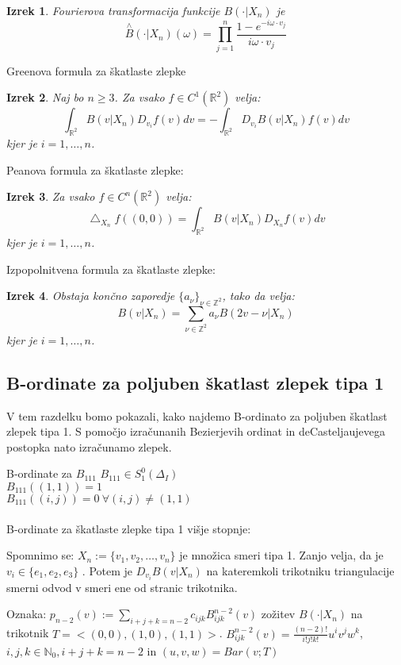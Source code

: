 \documentclass[12pt]{article}
\newtheorem{theorem}{Izrek}
\begin{document}
\begin{theorem}
Fourierova transformacija funkcije $B(\cdot|X_n)$ je 
$$\overset{\wedge}{B}(\cdot|X_n)(\omega) = \prod_{j=1}^n \frac{1-e^{-i\omega \cdot v_j}}{i \omega \cdot v_j}$$
\end{theorem}

Greenova formula za škatlaste zlepke
\begin{theorem}
Naj bo $n\geq 3$. Za vsako $f \in C^1(\mathbb{R}^2)$ velja: 
$$\int_{\mathbb{R}^2} B(v|X_n) D_{v_i} f(v) dv = - \int_{\mathbb{R}^2} D_{v_i} B(v|X_n) f(v) dv$$
kjer je $i = 1, \ldots, n$.
\end{theorem}

Peanova formula za škatlaste zlepke:
\begin{theorem}
Za vsako $f \in C^n(\mathbb{R}^2)$ velja: 
$$\bigtriangleup_{X_n} f((0,0))=  \int_{\mathbb{R}^2} B(v|X_n)D_{X_n} f(v) dv$$
kjer je $i = 1, \ldots, n$.
\end{theorem}

Izpopolnitvena formula za škatlaste zlepke: %
\begin{theorem}
Obstaja končno zaporedje $\{a_{\nu}\}_{\nu \in \mathbb{Z}^2}$, tako da velja:
$$B(v|X_n) =  \sum_{\nu \in \mathbb{Z}^2} a_{\nu} B(2v-\nu|X_n)$$
kjer je $i = 1, \ldots, n$.
\end{theorem}


\subsection{B-ordinate za poljuben škatlast zlepek tipa 1}
V tem razdelku bomo pokazali, kako najdemo B-ordinato za poljuben škatlast zlepek tipa 1. S pomočjo izračunanih Bezierjevih ordinat in deCasteljaujevega postopka nato izračunamo zlepek. %

B-ordinate za $B_{111}$
$B_{111} \in S_1^0(\Delta_I)$\\
$B_{111} ((1,1)) = 1$\\
$B_{111} ((i,j)) = 0\ \forall (i,j) \neq (1,1)$
\\
\\
B-ordinate za škatlaste zlepke tipa 1 višje stopnje:

Spomnimo se: $X_n := \{v_1, v_2, \ldots , v_n\}$ je množica smeri tipa 1. Zanjo velja, da je $v_i \in \{e_1, e_2, e_3\}$ .
Potem je $D_{v_i} B(v|X_n)$ na kateremkoli trikotniku triangulacije smerni odvod v smeri ene od stranic trikotnika. 

Oznaka: $p_{n-2} (v) := \sum_{i+j+k=n-2} c_{ijk} B_{ijk}^{n-2}(v)$ zožitev $B(\cdot | X_n)$ na trikotnik $T = <(0,0), (1, 0), (1,1)>$. $B_{ijk}^{n-2}(v) = \frac{(n-2)!}{i! j! k!} u^i v^j w^k$, $i, j, k \in \mathbb{N}_0, i+j+k=n-2$ in $(u,v, w ) = Bar(v; T)$
\end{document}
